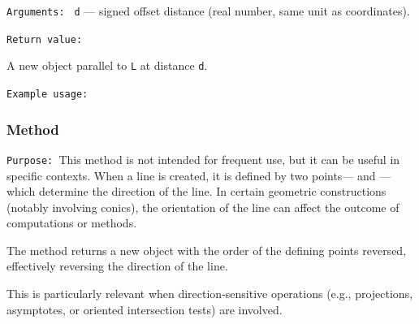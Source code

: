 \medskip
\texttt{Arguments: } \texttt{d} — signed offset distance (real number, same unit as coordinates).

\medskip
\texttt{Return value: }

A new  object parallel to \texttt{L} at distance \texttt{d}.

\medskip
\texttt{Example usage: }

\begin{tkzexample}[latex=.4\textwidth]
\end{tkzexample}



\subsubsection{Method }
\label{ssub:method_line_swap__line}

\texttt{Purpose: }This method is not intended for frequent use, but it can be useful in specific contexts.
When a line is created, it is defined by two points— and —which determine the direction of the line. In certain geometric constructions (notably involving conics), the orientation of the line can affect the outcome of computations or methods.

\medskip
The  method returns a new  object with the order of the defining points reversed, effectively reversing the direction of the line.

\medskip

This is particularly relevant when direction-sensitive operations (e.g., projections, asymptotes, or oriented intersection tests) are involved.

\vspace{1em}
\begin{tkzexample}[latex=7cm]
\end{tkzexample}

